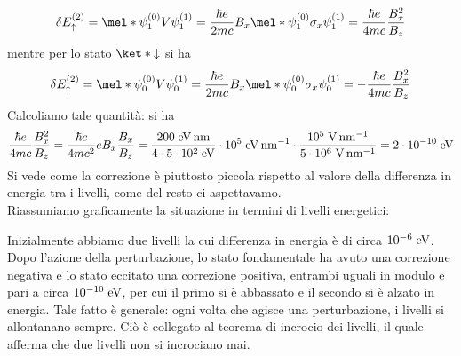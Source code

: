 \begin{soluzione}
   \begin{equation*}
      \delta E_{\uparrow}^{(2)}
      =\mel*{\psi_1^{(0)}}{V}{\psi_1^{(1)}}
      =\frac{\hbar e}{2 m c} B_x \mel*{\psi_1^{(0)}}{\sigma_x}{\psi_1^{(1)}}
      =\frac{\hbar e}{4 m c} \frac{B_x^2}{B_z}
   \end{equation*}
   mentre per lo stato $\ket*{\downarrow}$ si ha
   \begin{equation*}
      \delta E_{\uparrow}^{(2)}
      =\mel*{\psi_0^{(0)}}{V}{\psi_0^{(1)}}
      =\frac{\hbar e}{2 m c} B_x \mel*{\psi_0^{(0)}}{\sigma_x}{\psi_0^{(1)}}
      =-\frac{\hbar e}{4 m c} \frac{B_x^2}{B_z}
   \end{equation*}
   Calcoliamo tale quantità: si ha
   \begin{equation*}
      \frac{\hbar e}{4 m c} \frac{B_x^2}{B_z}
      =\frac{\hbar c}{4 m c^2} e B_x \frac{B_x}{B_z}
      =\rm \frac{200 \; eV \, nm}{4 \cdot 5 \cdot 10^2 \; eV} \cdot 10^5 \; eV \, nm^{-1} \cdot \frac{10^5 \; V \, nm^{-1}}{5 \cdot 10^6 \; V \, nm^{-1}}
      =2 \cdot 10^{-10} \; eV
   \end{equation*}
   Si vede come la correzione è piuttosto piccola rispetto al valore della differenza in energia tra i livelli, come del resto ci aspettavamo.\\
   Riassumiamo graficamente la situazione in termini di livelli energetici:
   \begin{figure}[H]
      \centering
   \end{figure}
   Inizialmente abbiamo due livelli la cui differenza in energia è di circa $10^{-6} \rm \; eV$. Dopo l'azione della perturbazione, lo stato fondamentale ha avuto una correzione negativa e lo stato eccitato una correzione positiva, entrambi uguali in modulo e pari a circa $10^{-10} \rm \; eV$, per cui il primo si è abbassato e il secondo si è alzato in energia. Tale fatto è generale: ogni volta che agisce una perturbazione, i livelli si allontanano sempre. Ciò è collegato al teorema di incrocio dei livelli, il quale afferma che due livelli non si incrociano mai.
\end{soluzione}

